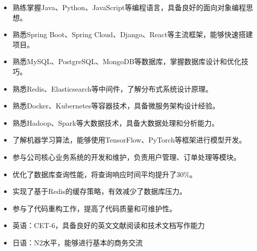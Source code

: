 \begin{itemize}
  \item 熟练掌握Java、Python、JavaScript等编程语言，具备良好的面向对象编程思想。
  \item 熟悉Spring Boot、Spring Cloud、Django、React等主流框架，能够快速搭建项目。
  \item 熟悉MySQL、PostgreSQL、MongoDB等数据库，掌握数据库设计和优化技巧。
  \item 熟悉Redis、Elasticsearch等中间件，了解分布式系统设计原理。
  \item 熟悉Docker、Kubernetes等容器技术，具备微服务架构设计经验。
  \item 熟悉Hadoop、Spark等大数据技术，具备大数据处理和分析能力。
  \item 了解机器学习算法，能够使用TensorFlow、PyTorch等框架进行模型开发。
\end{itemize}

\begin{itemize}
  \item 参与公司核心业务系统的开发和维护，负责用户管理、订单处理等模块。
  \item 优化了数据库查询性能，将查询响应时间平均提升了30\%。
  \item 实现了基于Redis的缓存策略，有效减少了数据库压力。
  \item 参与了代码重构工作，提高了代码质量和可维护性。
\end{itemize}

\begin{onehalfspacing}
\end{onehalfspacing}

\begin{itemize}
  \item 英语：CET-6，具备良好的英文文献阅读和技术文档写作能力
  \item 日语：N2水平，能够进行基本的商务交流
\end{itemize} 